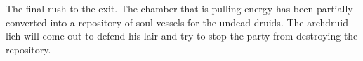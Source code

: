 The final rush to the exit.
The chamber that is pulling energy has been partially converted into a repository of soul vessels for the undead druids.
The archdruid lich will come out to defend his lair and try to stop the party from destroying the repository.
